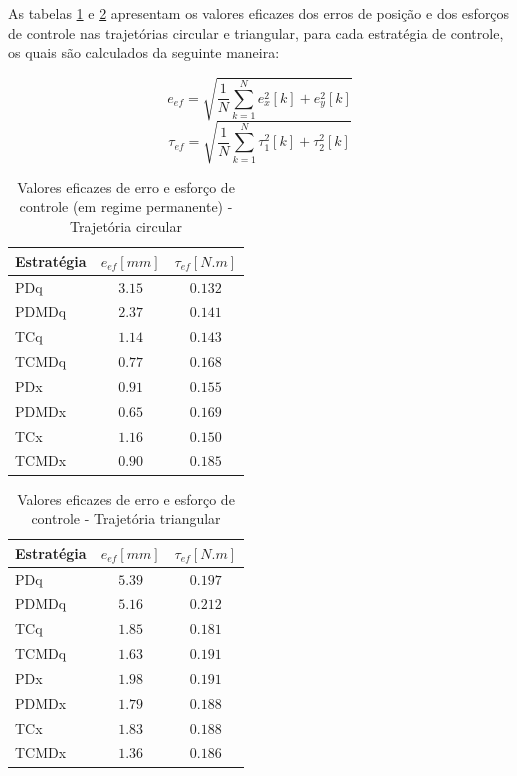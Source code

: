 \documentclass[]{politex}
\begin{document}
As tabelas \ref{tab:valoresEficazesCirculo} e \ref{tab:valoresEficazesTriangulo} apresentam os valores eficazes dos erros de posição e dos esforços de controle nas trajetórias circular e triangular, para cada estratégia de controle, os quais são calculados da seguinte maneira:

\begin{equation}
e_{ef} = \sqrt{ \frac{1}{N}\sum_{k=1}^N e_x^2[k] + e_y^2[k] }
\end{equation}
\begin{equation}
\tau_{ef} = \sqrt{ \frac{1}{N}\sum_{k=1}^N \tau_1^2[k] + \tau_2^2[k] }
\end{equation}

\begin{table}[H] 
\centering
\caption{Valores eficazes de erro e esforço de controle (em regime permanente) - Trajetória circular}
\label{tab:valoresEficazesCirculo}
\begin{tabular}{l|c|c}
Estratégia & $e_{ef} [mm]$  & $\tau_{ef} [N.m] $ \\ \hline
PDq        & $3.15$         & $0.132$               \\
PDMDq      & $2.37$         & $0.141$               \\
TCq        & $1.14$         & $0.143$               \\
TCMDq      & $0.77$         & $0.168$               \\
PDx        & $0.91$         & $0.155$               \\
PDMDx      & $0.65$         & $0.169$               \\
TCx        & $1.16$         & $0.150$               \\
TCMDx      & $0.90$         & $0.185$               \\
\end{tabular}
\end{table}

\begin{table}[H] 
\centering
\caption{Valores eficazes de erro e esforço de controle - Trajetória triangular}
\label{tab:valoresEficazesTriangulo}
\begin{tabular}{l|c|c}
Estratégia & $e_{ef} [mm]$  & $\tau_{ef} [N.m] $ \\ \hline
PDq        & $5.39$         & $0.197$               \\
PDMDq      & $5.16$         & $0.212$               \\
TCq        & $1.85$         & $0.181$               \\
TCMDq      & $1.63$         & $0.191$               \\
PDx        & $1.98$         & $0.191$               \\
PDMDx      & $1.79$         & $0.188$               \\
TCx        & $1.83$         & $0.188$               \\
TCMDx      & $1.36$         & $0.186$               \\
\end{tabular}
\end{table}
\end{document}
